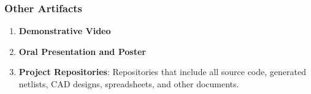 \subsubsection{Other Artifacts}

\begin{enumerate}

\item \textbf{Demonstrative Video}
\item \textbf{Oral Presentation and Poster}
\item \textbf{Project Repositories}: Repositories that include all source code,
generated netlists, CAD designs, spreadsheets, and other documents.

\end{enumerate}